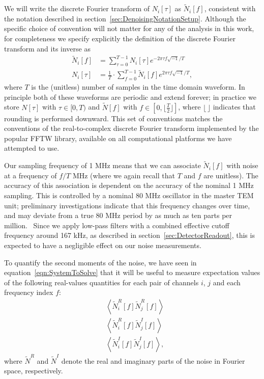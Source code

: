 We will write the discrete Fourier transform of $N_i[\tau]$ as $\widetilde{N}_i[f]$, consistent with the notation described in section~\ref{sec:DenoisingNotationSetup}.  Although the specific choice of convention will not matter for any of the analysis in this work, for completeness we specify explicitly the definition of the discrete Fourier transform and its inverse as
\begin{align}
\widetilde{N}_i[f] &= \sum_{\tau = 0}^{T-1} N_i[\tau] e^{-2\pi \tau f \sqrt{-1}/T}\label{eqn:NoiseChapterDefnFourierTransform}\\
N_i[\tau] &= \frac{1}{T}\cdot \sum_{f = 0}^{T-1} \widetilde{N}_i[f] e^{2\pi \tau f \sqrt{-1}/T},
\end{align}
where $T$ is the (unitless) number of samples in the time domain waveform.  In principle both of these waveforms are periodic and extend forever; in practice we store $N[\tau]$ with $\tau \in [0, T)$ and $\widetilde{N}[f]$ with $f \in \left[0, \lfloor \frac{T}{2} \rfloor\right]$, where $\lfloor\,\rfloor$ indicates that rounding is performed downward.  This set of conventions matches the conventions of the real-to-complex discrete Fourier transform implemented by the popular FFTW library, available on all computational platforms we have attempted to use.~\cite{FFTW05}

Our sampling frequency of 1 MHz means that we can associate $\widetilde{N}_i[f]$ with noise at a frequency of $f/T$ MHz (where we again recall that $T$ and $f$ are unitless).  The accuracy of this association is dependent on the accuracy of the nominal 1 MHz sampling.  This is controlled by a nominal 80 MHz oscillator in the master TEM unit; preliminary investigations indicate that this frequency changes over time, and may deviate from a true 80 MHz period by as much as ten parts per million.~\cite{DAQWeirdDetails,EXOElectronicsFunctionalSpecification}  Since we apply low-pass filters with a combined effective cutoff frequency around 167 kHz, as described in section~\ref{sec:DetectorReadout}, this is expected to have a negligible effect on our noise measurements.

To quantify the second moments of the noise, we have seen in equation~\ref{eqn:SystemToSolve} that it will be useful to measure expectation values of the following real-values quantities for each pair of channels $i$, $j$ and each frequency index $f$:
\begin{subequations}\label{eq:NoiseChapterAllExpValues}\begin{align}
&\left<\widetilde{N}^R_i[f]\widetilde{N}^R_j[f]\right>\label{eq:NoiseChapterFirstExpValue}\\
&\left<\widetilde{N}^R_i[f]\widetilde{N}^I_j[f]\right>\label{eq:NoiseChapterSecondExpValue}\\
&\left<\widetilde{N}^I_i[f]\widetilde{N}^I_j[f]\right>\label{eq:NoiseChapterThirdExpValue},
\end{align}\end{subequations}
where $\widetilde{N}^R$ and $\widetilde{N}^I$ denote the real and imaginary parts of the noise in Fourier space, respectively.


